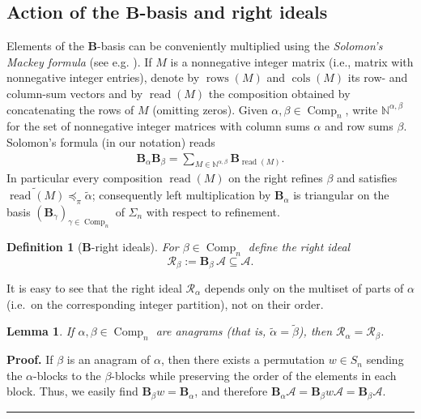 \documentclass[submission]{FPSAC2026}
\newtheorem{defn}{Definition}
\newtheorem{lem}{Lemma}
\newcommand{\BB}{\mathbf{B}} %
\newcommand{\Comp}{\operatorname{Comp}}
\newenvironment{proof}[1][Proof]{\noindent\textbf{#1.} }{\ \rule{0.5em}{0.5em}}
\begin{document}
\subsection{Action of the \(\mathbf{B}\)-basis and right ideals}
\label{sec:B-action}

Elements of the \(\mathbf{B}\)-basis can be conveniently
multiplied using the
\emph{Solomon's Mackey formula} (see e.g. \cite[Theorem 2]{Willigenburg98}).
If \(M\) is a %
nonnegative integer matrix
(i.e., matrix with nonnegative integer entries),
denote by \(\operatorname{rows}(M)\) and
\(\operatorname{cols}(M)\) its row- and column-sum vectors and by
\(\operatorname{read}(M)\) the composition obtained by concatenating the
rows of \(M\) (omitting zeros).  Given \(\alpha,\beta\in\Comp_n\), write
\(\mathbb N^{\alpha,\beta}\) for the set of nonnegative integer matrices
with column sums \(\alpha\) and row sums \(\beta\).  Solomon's formula
(in our notation) reads
\begin{align}
\mathbf{B}_\alpha\mathbf{B}_\beta
   = \sum_{M\in\mathbb N^{\alpha,\beta}} \mathbf{B}_{\operatorname{read}(M)}.
\label{eq.solmac}
\end{align}
In particular every composition \(\operatorname{read}(M)\) on the right
refines \(\beta\) and satisfies \(\widetilde{\operatorname{read}(M)}
\preceq_\pi \widetilde{\alpha}\); consequently
left multiplication by \(\mathbf{B}_\alpha\) is triangular on the basis
\((\mathbf{B}_\gamma)_{\gamma\in\Comp_n}\) of $\Sigma_n$ with respect to refinement.

\begin{defn}[$\mathbf{B}$-right ideals]
For \(\beta\in\Comp_n\) define the right ideal
\[
\mathcal R_\beta := \mathbf{B}_\beta\,\mathcal A \subseteq \mathcal A.
\]
\end{defn}

It is easy to see that the right ideal \(\mathcal R_\alpha\) depends only
on the multiset of parts of \(\alpha\) (i.e.\ on the corresponding
integer partition), not on their order.

\begin{lem}\label{prop.Rbeta.sym}
If \(\alpha,\beta\in\Comp_n\) are anagrams
(that is, \(\widetilde{\alpha} = \widetilde{\beta}\)),
then \(\mathcal R_\alpha=\mathcal R_\beta\).
\end{lem}

\begin{proof}
If \(\beta\) is an anagram of \(\alpha\), then there
exists a permutation \(w\in S_n\) sending the \(\alpha\)-blocks to the
\(\beta\)-blocks while preserving the order of the elements in each
block.
Thus, we easily find
\( \BB_\beta w = \BB_\alpha \), and therefore
\(\mathbf{B}_\alpha\mathcal A=\mathbf{B}_\beta w\mathcal A=\mathbf{B}_\beta\mathcal A\).
\end{proof}
\end{document}
